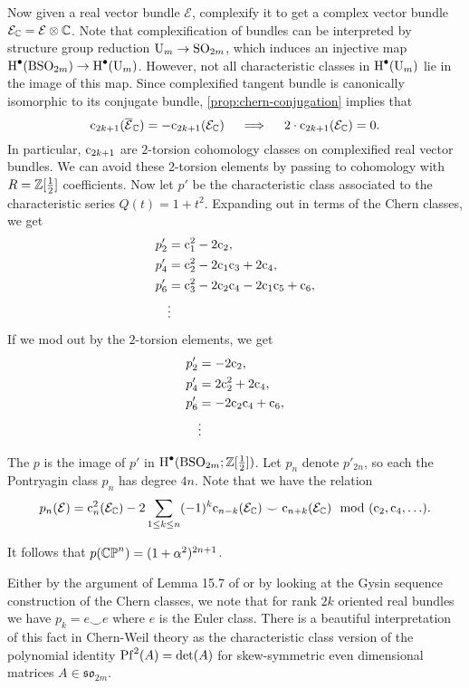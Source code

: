 Now given a real vector bundle $\mathcal{E}$, complexify it to get a complex vector bundle $\mathcal{E}_{\mathbb{C}} = \mathcal{E}\otimes \mathbb{C}$. 
Note that complexification of bundles can be interpreted by structure group reduction $\mathrm{U}_m \to \mathrm{SO}_{2m}$, which induces an injective map $\operatorname{H}^\bullet(\mathrm{BSO}_{2m})\to \operatorname{H}^\bullet(\mathrm{U}_m)$. However, not all characteristic classes in $\operatorname{H}^\bullet(\mathrm{U}_m)$ lie in the image of this map. 
Since complexified tangent bundle is canonically isomorphic to its conjugate bundle,  \cref{prop:chern-conjugation} implies that
\[
	\mathrm{c}_{2k+1}(\overline{\mathcal{E}}_{\mathbb{C}}) = -\mathrm{c}_{2k+1}(\mathcal{E}_{\mathbb{C}}) \quad\implies\quad 2\cdot \mathrm{c}_{2k+1}(\mathcal{E}_{\mathbb{C}}) = 0.
\]
In particular, $\mathrm{c}_{2k+1}$ are $2$-torsion cohomology classes on complexified real vector bundles. We can avoid these $2$-torsion elements by passing to cohomology with $R=\mathbb{Z}[\frac{1}{2}]$ coefficients. Now let $p'$ be the characteristic class associated to the characteristic series $Q(t)=1+t^2$. Expanding out in terms of the Chern classes, we get
\[
	\begin{aligned}
		p'_2 &= \mathrm{c}_1^2 - 2\mathrm{c}_2,\\
		p'_4 &= \mathrm{c}_2^2 - 2\mathrm{c}_1 \mathrm{c}_3 + 2\mathrm{c}_4,\\
		p'_6 &= \mathrm{c}_3^2 - 2\mathrm{c}_2 \mathrm{c}_4 - 2\mathrm{c}_1 \mathrm{c}_5 + \mathrm{c}_6,\\
				 &\vdots
	\end{aligned}
\]
If we mod out by the $2$-torsion elements, we get
\[
	\begin{aligned}
		p'_2 &= -2\mathrm{c}_2,\\
		p'_4 &= 2\mathrm{c}_2^2+2\mathrm{c}_4,\\
		p'_6 &= -2 \mathrm{c}_2\mathrm{c}_4 + \mathrm{c}_6,\\
				 &\vdots
	\end{aligned}
\]

\begin{definition}
	The  $p$ is the image of $p'$ in $\operatorname{H}^\bullet(\mathrm{BSO}_{2m}; \mathbb{Z}[\frac{1}{2}])$. Let $p_n$ denote $p'_{2n}$, so each the Pontryagin class $p_n$ has degree $4n$. Note that we have the relation
	\[
		p_n(\mathcal{E}) =\mathrm{c}_n^2(\mathcal{E}_{\mathbb{C}}) - 2\sum_{1\leq k\leq n}(-1)^k\mathrm{c}_{n-k}(\mathcal{E}_{\mathbb{C}})\smile \mathrm{c}_{n+k}(\mathcal{E}_{\mathbb{C}})\mod (\mathrm{c}_{2}, \mathrm{c}_4, \ldots).
	\]
\end{definition}

\begin{example}
	It follows that $p(\mathbb{CP}^n) = (1+\alpha^2)^{2n+1}$.
\end{example}

\begin{remark*}
	Either by the argument of Lemma 15.7 of \cite{milnorstasheff1974} or by looking at the Gysin sequence construction of the Chern classes, we note that for rank $2k$ oriented real bundles we have $p_k = e\smile e$ where $e$ is the Euler class. There is a beautiful interpretation of this fact in Chern-Weil theory as the characteristic class version of the polynomial identity $\operatorname{Pf}^2(A) = \det(A)$ for skew-symmetric even dimensional matrices $A\in \mathfrak{so}_{2m}$.
\end{remark*}


